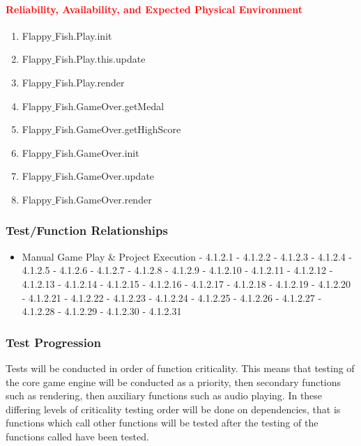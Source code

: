 \documentclass[11pt, oneside]{article}   	%
\begin{document}
\paragraph{\textcolor{red}{Reliability, Availability, and Expected Physical Environment }}
\begin{enumerate}

\item Flappy$\_$Fish.Play.init

\item Flappy$\_$Fish.Play.this.update

\item Flappy$\_$Fish.Play.render

\item Flappy$\_$Fish.GameOver.getMedal

\item Flappy$\_$Fish.GameOver.getHighScore

\item Flappy$\_$Fish.GameOver.init

\item Flappy$\_$Fish.GameOver.update

\item Flappy$\_$Fish.GameOver.render

\end{enumerate}

\subsubsection{Test/Function Relationships}
\begin{itemize}
\item Manual Game Play \& Project Execution
\subitem - 4.1.2.1
\subitem - 4.1.2.2
\subitem - 4.1.2.3
\subitem - 4.1.2.4
\subitem - 4.1.2.5
\subitem - 4.1.2.6
\subitem - 4.1.2.7
\subitem - 4.1.2.8
\subitem - 4.1.2.9
\subitem - 4.1.2.10
\subitem - 4.1.2.11
\subitem - 4.1.2.12
\subitem - 4.1.2.13
\subitem - 4.1.2.14
\subitem - 4.1.2.15
\subitem - 4.1.2.16
\subitem - 4.1.2.17
\subitem - 4.1.2.18
\subitem - 4.1.2.19
\subitem - 4.1.2.20
\subitem - 4.1.2.21
\subitem - 4.1.2.22
\subitem - 4.1.2.23
\subitem - 4.1.2.24
\subitem - 4.1.2.25
\subitem - 4.1.2.26
\subitem - 4.1.2.27
\subitem - 4.1.2.28
\subitem - 4.1.2.29
\subitem - 4.1.2.30
\subitem - 4.1.2.31
\end{itemize}

\subsubsection{Test Progression}
Tests will be conducted in order of function criticality. This means that testing of the core game engine will be conducted as a priority, then secondary functions such as rendering, then auxiliary functions such as audio playing. In these differing levels of criticality testing order will be done on dependencies, that is functions which call other functions will be tested after the testing of the functions called have been tested.
\end{document}
